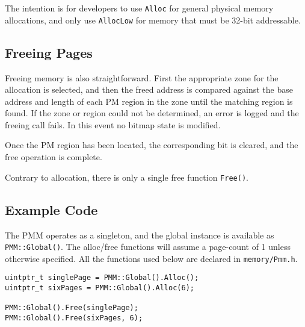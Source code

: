 The intention is for developers to use \verb|Alloc| for general physical memory allocations, and only use \verb|AllocLow| for memory that must be 32-bit addressable.

\subsection{Freeing Pages}
Freeing memory is also straightforward. First the appropriate zone for the allocation is selected, and then the freed address is compared against the base address and length of each PM region in the zone until the matching region is found. If the zone or region could not be determined, an error is logged and the freeing call fails. In this event no bitmap state is modified.

Once the PM region has been located, the corresponding bit is cleared, and the free operation is complete.

Contrary to allocation, there is only a single free function \verb|Free()|.

\subsection{Example Code}
The PMM operates as a singleton, and the global instance is available as \verb|PMM::Global()|. The alloc/free functions will assume a page-count of 1 unless otherwise specified. All the functions used below are declared in \verb|memory/Pmm.h|.

\begin{verbatim}
uintptr_t singlePage = PMM::Global().Alloc();
uintptr_t sixPages = PMM::Global().Alloc(6);

PMM::Global().Free(singlePage);
PMM::Global().Free(sixPages, 6);
\end{verbatim}
